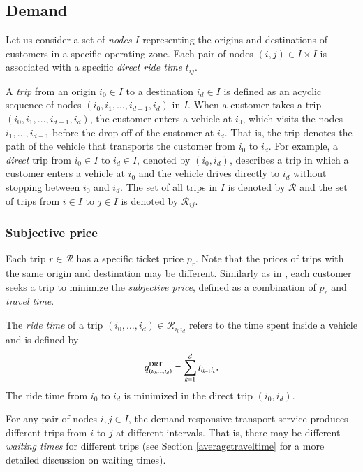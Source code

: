 \documentclass[dissertation,draft*]{aaltoseries}
\begin{document}
\subsection{Demand}
\label{demand}
Let us consider a set of \emph{nodes} $I$ representing the origins and destinations of customers in a specific operating zone.
Each pair of nodes $(i,j) \in I \times I$ is associated with a specific \emph{direct ride time} $t_{ij}$.

A \emph{trip} from an origin $i_0 \in I$ to a destination $i_d \in I$ is defined as an acyclic sequence of nodes 
$(i_0,i_1,\ldots,i_{d-1},i_d)$ in $I$.
When a customer takes a trip $(i_0,i_1,\ldots,i_{d-1},i_d)$, the customer enters a vehicle at $i_0$, which
visits the nodes $i_1,\ldots,i_{d-1}$ before the drop-off of the customer at $i_d$. That is, the
trip denotes the path of the vehicle that transports the customer from $i_0$ to $i_d$.
For example, a \emph{direct} trip from $i_0 \in I$ to $i_d \in I$, denoted by $(i_0,i_d)$, describes a trip in which a customer enters 
a vehicle at $i_0$ and the vehicle drives directly to $i_d$ without stopping between $i_0$ and $i_d$. 
The set of all trips in $I$ is denoted by $\mathcal{R}$ and the set of trips from $i\in I$ to $j \in I$ is denoted by $\mathcal{R}_{ij}$.

\subsubsection{Subjective price}
Each trip $r \in \mathcal{R}$ has a specific ticket price $p_r$. 
Note that the prices of trips with the same origin and destination may be different.
Similarly as in \citep{yang2010}, each customer seeks a trip to minimize the \emph{subjective price}, 
defined as a combination of $p_r$ and \emph{travel time}. 

The \emph{ride time} of a trip $(i_0,\ldots,i_d) \in \mathcal{R}_{i_0i_d}$ 
refers to the time spent inside a vehicle and is defined by
\begin{align}
\label{ridetime}
q_{(i_0,\ldots,i_d)}^{\rm DRT} = \sum_{k=1}^{d} t_{i_{k-1}i_{k}}.
\end{align}
The ride time from $i_0$ to $i_d$ is minimized in the direct trip $(i_0,i_d)$. 

For any pair of nodes $i,j \in I$,
the demand responsive transport service produces different trips from $i$ to $j$ at different intervals.
That is, there may be different \emph{waiting times} for different trips
(see Section \ref{averagetraveltime} for a more detailed discussion on waiting times).
\end{document}
